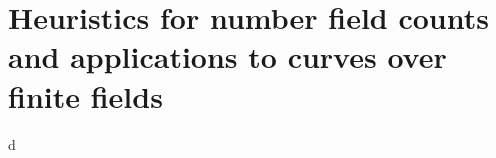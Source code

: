 
\section{Heuristics for number field counts and applications to curves over finite fields}\label{sec:wood-iv}





d

